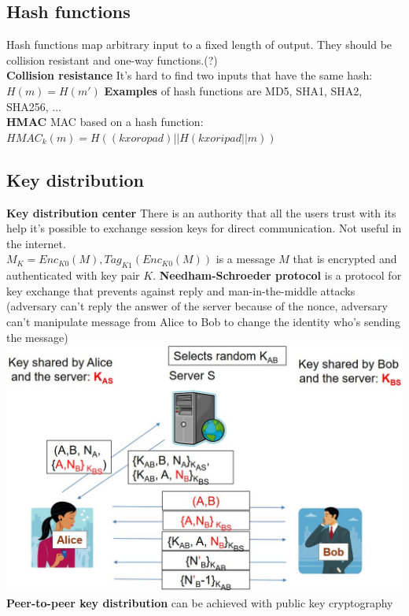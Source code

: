 \documentclass[12pt]{article}
\begin{document}
	\subsection{Hash functions}
	Hash functions map arbitrary input to a fixed length of output. They should be collision resistant and one-way functions.(?)\\
	\textbf{Collision resistance} It's hard to find two inputs that have the same hash: $H(m) = H(m')$
	\textbf{Examples} of hash functions are MD5, SHA1, SHA2, SHA256, ...\\
	\textbf{HMAC} MAC based on a hash function: $HMAC_k(m) = H((k xor opad) || H(k xor ipad || m))$
	
	\subsection{Key distribution}
	\textbf{Key distribution center} There is an authority that all the users trust with its help it's possible to exchange session keys for direct communication. Not useful in the internet.\\
	${M}_K = Enc_{K0}(M), Tag_{K1}(Enc_{K0}(M))$ is a message $M$ that is encrypted and authenticated with key pair $K$.
	\textbf{Needham-Schroeder protocol} is a protocol for key exchange that prevents against reply and man-in-the-middle attacks (adversary can't reply the answer of the server because of the nonce, adversary can't manipulate message from Alice to Bob to change the identity who's sending the message)\\
	\includegraphics[width=\textwidth]{figures/needham-schroeder-protocol.JPG}\\
	\textbf{Peer-to-peer key distribution} can be achieved with public key cryptography\\
	

	
	
\end{document}
